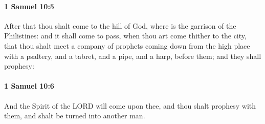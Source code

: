 		\paragraph{1 Samuel 10:5} %
			\label{1SAMUEL-10-5}

			After that thou shalt come to the hill of God, where is the garrison of the Philistines: and it shall come to pass, when thou art come thither to the city, that thou shalt meet a company of prophets coming down from the high place with a psaltery, and a tabret, and a pipe, and a harp, before them; and they shall prophesy:


		\paragraph{1 Samuel 10:6} %
			\label{1SAMUEL-10-6}

			And the Spirit of the LORD will come upon thee, and thou shalt prophesy with them, and shalt be turned into another man.

